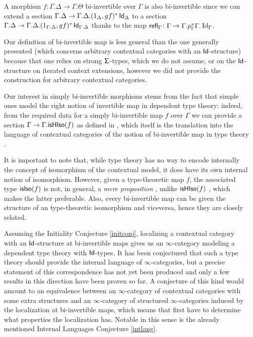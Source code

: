 \begin{rmk}
  A morphism $f\colon\Gamma.\Delta\rightarrow\Gamma.\Theta$ bi-invertible over
  $\Gamma$ is also bi-invertible since we can extend a section
  $\Gamma.\Delta\rightarrow\Gamma.\Delta.(1_\Delta,gf)^*\operatorname{\mathsf{Id}}_\Delta$
  to a section
  $\Gamma.\Delta\rightarrow\Gamma.\Delta.(1_{\Gamma.\Delta},gf)^*\operatorname{\mathsf{Id}}_{\Gamma.\Delta}$
  thanks to the map
  $\operatorname{\mathsf{refl}}_\Gamma\colon\Gamma\rightarrow\Gamma.p^*_\Gamma\Gamma.\operatorname{Id}_\Gamma$.
\end{rmk}

\begin{rmk}
  Our definition of bi-invertible map is less general than the one generally
  presented (which concerns arbitrary contextual categories with an
  $\operatorname{\mathsf{Id}}$-structure) because that one relies on strong $\operatorname{\mathsf{\Sigma}}$-types, which we
  do not assume, or on the $\operatorname{\mathsf{Id}}$-structure on iterated context extensions,
  however we did not provide the construction for arbitrary contextual
  categories.
\end{rmk}

\begin{rmk}
  Our interest in simply bi-invertible morphisms stems from the fact that simple
  ones model the right notion of invertible map in dependent type theory:
  indeed, from the
  required data for a simply bi-invertible map $f$ over $\Gamma$ we can provide
  a section $\Gamma\rightarrow\Gamma.\mathsf{isHIso}({f})$
  as defined in \cite[Def.\ B.3.3]{KL12}, which itself is the translation into
  the language of contextual categories of the notion of bi-invertible map in
  type theory \cite[Def.\ 4.3.1]{Uni13}.

\noindent
  It is important to note that, while type theory has no way to encode
  internally the concept of isomorphism of the contextual model, it does have
  its own internal notion of isomorphism. However, given a type-theoretic map
  $f$, the associated type $\mathsf{isIso}({f})$ is not, in general, a \emph{mere
  proposition} \cite[Def.\ 3.3.1]{Uni13}, unlike $\mathsf{isHIso}({f})$
  \cite[Thm.\ 4.3.2]{Uni13}, which makes the latter
  preferable. Also, every bi-invertible map can be given the structure of an
  type-theoretic isomorphism and viceversa, hence they are closely related.
\end{rmk}

\begin{rmk}
  Assuming the Initiality Conjecture \ref{initconj}, localizing a contextual
  category with an
  $\operatorname{\mathsf{Id}}$-structure at bi-invertible maps gives us an $\infty$-category modeling a
  dependent type theory with $\operatorname{\mathsf{Id}}$-types. It has been conjectured that such a
  type theory should provide the internal language of $\infty$-categories, but a
  precise statement of this correspondence has not yet been produced and only a
  few results in this direction have been proven so far. A conjecture of this kind
  would amount to an equivalence between an $\infty$-category of contextual
  categories with some extra structures and an $\infty$-category of structured
  $\infty$-categories induced by the localization at bi-invertible maps, which
  means that first have to determine what properties the localization has.
  Notable in this sense is the already mentioned Internal Languages Conjecture
  \ref{intlang}.
\end{rmk}

